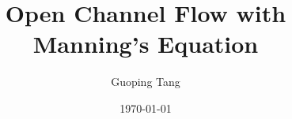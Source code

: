 \documentclass[12pt, a4paper]{article}
\title{Open Channel Flow with Manning's Equation}
\author{Guoping Tang}
\date\today{}
\begin{document}
\maketitle

\begin{abstract}
\end{abstract}












\end{document}
